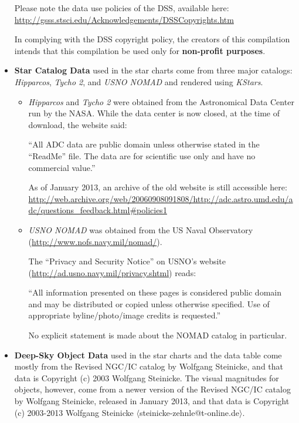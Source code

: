 \begin{itemize}
  Please note the data use policies of the DSS, available here:
  \url{http://gsss.stsci.edu/Acknowledgements/DSSCopyrights.htm}
  
  In complying with the DSS copyright policy, the creators of this
  compilation intends that this compilation be used only for
  \textbf{non-profit purposes}.

\item \textbf{Star Catalog Data} used in the star charts come from
  three major catalogs: \emph{Hipparcos}, \emph{Tycho 2}, and
  \emph{USNO NOMAD} and rendered using \emph{KStars}.

  \begin{itemize}
    \item \emph{Hipparcos} and \emph{Tycho 2} were obtained from the
      Astronomical Data Center run by the NASA. While the data center
      is now closed, at the time of download, the website said:

      ``All ADC data are public domain unless otherwise stated in the
      ``ReadMe'' file. The data are for scientific use only and have
      no commercial value.''

      As of January 2013, an archive of the old website is still
      accessible here:
      {\small \url{http://web.archive.org/web/20060908091808/http://adc.astro.umd.edu/adc/questions_feedback.html#policies1}}

    \item \emph{USNO NOMAD} was obtained from the US Naval Observatory
      (\url{http://www.nofs.navy.mil/nomad/}).

      The ``Privacy and Security Notice'' on USNO's website
      (\url{http://ad.usno.navy.mil/privacy.shtml}) reads:

      ``All information presented on these pages is considered public
      domain and may be distributed or copied unless otherwise
      specified. Use of appropriate byline/photo/image credits is
      requested.''

      No explicit statement is made about the NOMAD catalog in
      particular.
  \end{itemize}

\item \textbf{Deep-Sky Object Data} used in the star charts and the
  data table come mostly from the Revised NGC/IC catalog by Wolfgang
  Steinicke, and that data is Copyright (c) 2003 Wolfgang
  Steinicke. The visual magnitudes for objects, however, come from a
  newer version of the Revised NGC/IC catalog by Wolfgang Steinicke,
  released in January 2013, and that data is Copyright (c) 2003-2013
  Wolfgang Steinicke $\langle$steinicke-zehnle@t-online.de$\rangle$.


\end{itemize}
